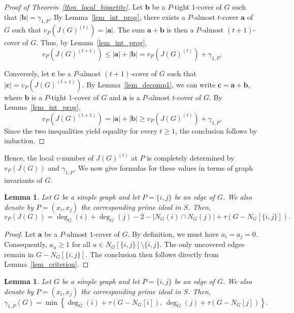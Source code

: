 \documentclass[12pt,amscd]{amsart}
\newtheorem{lem}[thm]{Lemma}
\theoremstyle{definition}
\numberwithin{equation}{section}
\begin{document}
\begin{proof}[Proof of Theorem~\ref{thm_local_bipartite}]
Let $\mathbf{b}$ be a $P$-tight $1$-cover of $G$ such that $|\mathbf{b}| = \gamma_{1,P}$. By Lemma~\ref{lem_int_prog}, there exists a $P$-almost $t$-cover $\mathbf{a}$ of $G$ such that $v_P(J(G)^{(t)}) = |\mathbf{a}|$. The sum $\mathbf{a} + \mathbf{b}$ is then a $P$-almost $(t+1)$-cover of $G$. Thus, by Lemma~\ref{lem_int_prog}, 
$$v_P(J(G)^{(t+1)}) \le |\mathbf{a}| + |\mathbf{b}| = v_P(J(G)^{(t)}) + \gamma_{1,P}.$$

Conversely, let $\mathbf{c}$ be a $P$-almost $(t+1)$-cover of $G$ such that $|\mathbf{c}| = v_P(J(G)^{(t+1)})$. By Lemma~\ref{lem_decomp1}, we can write $\mathbf{c} = \mathbf{a} + \mathbf{b}$, where $\mathbf{b}$ is a $P$-tight $1$-cover of $G$ and $\mathbf{a}$ is a $P$-almost $t$-cover of $G$. By Lemma~\ref{lem_int_prog}, 
$$v_P(J(G)^{(t+1)}) = |\mathbf{a}| + |\mathbf{b}| \ge v_P(J(G)^{(t)}) + \gamma_{1,P}.$$
Since the two inequalities yield equality for every $t \ge 1$, the conclusion follows by induction.
\end{proof}

Hence, the local $v$-number of $J(G)^{(t)}$ at $P$ is completely determined by $v_P(J(G))$ and $\gamma_{1,P}$. We now give formulas for these values in terms of graph invariants of $G$.

\begin{lem}\label{lem_v_1}
Let $G$ be a simple graph and let $P = \{i,j\}$ be an edge of $G$. We also denote by $P = (x_i, x_j)$ the corresponding prime ideal in $S$. Then,
\[
v_P(J(G)) = \deg_G(i) + \deg_G(j) - 2 - |N_G(i) \cap N_G(j)| + \tau(G - N_G[\{i,j\}]).
\]
\end{lem}

\begin{proof}
Let $\mathbf{a}$ be a $P$-almost $1$-cover of $G$. By definition, we must have $a_i = a_j = 0$. Consequently, $a_u \ge 1$ for all $u \in N_G[\{i,j\}] \setminus \{i,j\}$. The only uncovered edges remain in $G - N_G[\{i,j\}]$. The conclusion then follows directly from Lemma~\ref{lem_criterion}.
\end{proof}

\begin{lem}\label{lem_gamma_1}
Let $G$ be a simple graph and let $P = \{i,j\}$ be an edge of $G$. We also denote by $P = (x_i, x_j)$ the corresponding prime ideal in $S$. Then,
\[
\gamma_{1,P}(G) = \min \left\{ \deg_G(i) + \tau(G - N_G[i]), \, \deg_G(j) + \tau(G - N_G[j]) \right\}.
\]
\end{lem}
\end{document}
